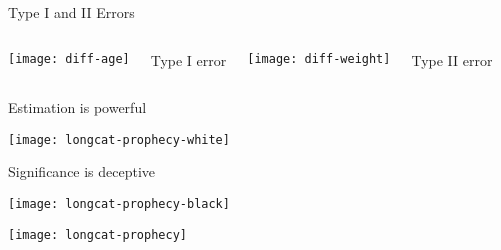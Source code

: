 \documentclass[t]{beamer}
\begin{document}
	\begin{frame}[c]{Type I and II Errors}
		
		\begin{columns}[c]
			\texttt{[image: diff-age]}
			
			\begin{center}
				Type I error
			\end{center}

			\texttt{[image: diff-weight]}

			\begin{center}
				Type II error
			\end{center}
		\end{columns}
		
	\end{frame}
	
  \begin{frame}[plain, c]{Estimation is powerful}

		\begin{center}
			\texttt{[image: longcat-prophecy-white]}
    \end{center}
		  
  \end{frame}
	
  \begin{frame}[plain, c]{Significance is deceptive}

		\begin{center}
			\texttt{[image: longcat-prophecy-black]}
    \end{center}
		  
  \end{frame}
	
  \begin{frame}[plain, c]{}

		\begin{center}
			\texttt{[image: longcat-prophecy]}
    \end{center}
		  
  \end{frame}
	
\end{document}
